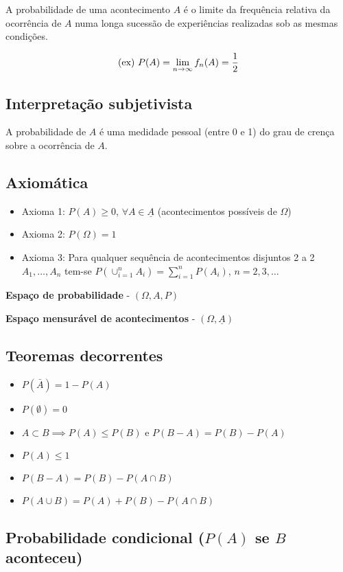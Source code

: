 \documentclass{article}
\begin{document}
A probabilidade de uma acontecimento $A$ é o limite da frequência relativa da ocorrência de $A$ numa longa sucessão de experiências realizadas sob as mesmas condições.

$$ \textnormal{(ex) }P(A) = \lim_{n\to\infty}f_n(A)=\frac{1}{2} $$

\subsection*{Interpretação subjetivista}

A probabilidade de $A$ é uma medidade pessoal (entre 0 e 1) do grau de crença sobre a ocorrência de $A$.

\subsection*{Axiomática}

\begin{itemize}
    \item Axioma 1: $P(A) \geq 0$, $\forall A \in \underline{A}$ (acontecimentos possíveis de $\Omega$)
    \item Axioma 2: $P(\Omega) = 1$
    \item Axioma 3: Para qualquer sequência de acontecimentos disjuntos 2 a 2 $A_1, \dots, A_n$ tem-se $P(\cup_{i=1}^n A_i) = \sum_{i=1}^n P(A_i)$, $n = 2, 3, \dots$
\end{itemize}

\textbf{Espaço de probabilidade} - $(\Omega, A, P)$

\textbf{Espaço mensurável de acontecimentos} - $(\Omega, \underline{A})$

\subsection*{Teoremas decorrentes}

\begin{itemize}
    \item $P(\bar{A}) = 1 - P(A)$
    \item $P(\emptyset) = 0$
    \item $A \subset B \implies P(A) \leq P(B)$ e $P(B - A) = P(B) - P(A)$
    \item $P(A) \leq 1$
    \item $P(B - A) = P(B) - P(A \cap B)$
    \item $P(A \cup B) = P(A) + P(B) - P(A \cap B)$
\end{itemize}

\subsection*{Probabilidade condicional ($P(A)$ se $B$ aconteceu)}
\end{document}
